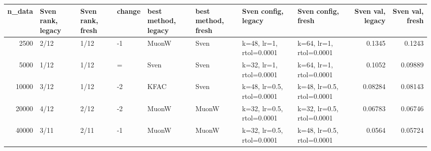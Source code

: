 \begin{tabular}{rlllllllrr}
\toprule
n\_data & Sven rank, legacy & Sven rank, fresh & change & best method, legacy & best method, fresh & Sven config, legacy & Sven config, fresh & Sven val, legacy & Sven val, fresh \\
\midrule
2500 & 2/12 & 1/12 & -1 & MuonW & Sven & k=48, lr=1, rtol=0.0001 & k=64, lr=1, rtol=0.0001 & 0.1345 & 0.1243 \\
5000 & 1/12 & 1/12 & = & Sven & Sven & k=32, lr=1, rtol=0.0001 & k=64, lr=1, rtol=0.0001 & 0.1052 & 0.09889 \\
10000 & 3/12 & 1/12 & -2 & KFAC & Sven & k=48, lr=0.5, rtol=0.0001 & k=48, lr=0.5, rtol=0.0001 & 0.08284 & 0.08143 \\
20000 & 4/12 & 2/12 & -2 & MuonW & MuonW & k=32, lr=0.5, rtol=0.0001 & k=32, lr=0.5, rtol=0.0001 & 0.06783 & 0.06746 \\
40000 & 3/11 & 2/11 & -1 & MuonW & MuonW & k=32, lr=0.5, rtol=0.0001 & k=48, lr=0.5, rtol=0.0001 & 0.0564 & 0.05724 \\
\bottomrule
\end{tabular}
